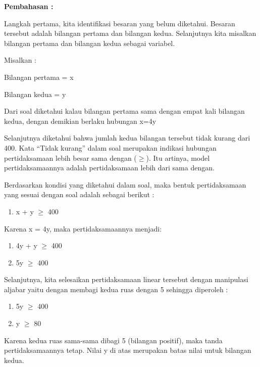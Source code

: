 \documentclass[11pt,fleqn]{book} %
\begin{document}
\noindent \textbf{Pembahasan :}

\noindent Langkah pertama, kita identifikasi besaran yang belum diketahui. Besaran tersebut adalah bilangan pertama dan bilangan kedua. Selanjutnya kita misalkan bilangan pertama dan bilangan kedua sebagai variabel.

\noindent Misalkan :

\noindent Bilangan pertama = x

\noindent Bilangan kedua = y 

\noindent Dari soal diketahui kalau bilangan pertama sama dengan empat kali bilangan kedua, dengan demikian berlaku hubungan x=4y 

\noindent 

\noindent Selanjutnya diketahui bahwa jumlah kedua bilangan tersebut tidak kurang dari 400. Kata ``Tidak kurang'' dalam soal merupakan indikasi hubungan pertidaksamaan lebih besar sama dengan ($\mathrm{\ge}$). Itu artinya, model pertidaksamaannya adalah pertidaksamaan lebih dari sama dengan.

\noindent 

\noindent Berdasarkan kondisi yang diketahui dalam soal, maka bentuk pertidaksamaan yang sesuai dengan soal adalah sebagai berikut :

\begin{enumerate}
\item  x + y $\mathrm{\ge}$ 400
\end{enumerate}

\noindent Karena x = 4y, maka pertidaksamaannya menjadi:

\begin{enumerate}
\item  4y + y $\mathrm{\ge}$ 400

\item  5y $\mathrm{\ge}$ 400
\end{enumerate}

\noindent 

\noindent Selanjutnya, kita selesaikan pertidaksamaan linear tersebut dengan manipulasi aljabar yaitu dengan membagi kedua ruas dengan 5 sehingga diperoleh :

\begin{enumerate}
\item  5y $\mathrm{\ge}$ 400

\item  y $\mathrm{\ge}$ 80
\end{enumerate}

\noindent Karena kedua ruas sama-sama dibagi 5 (bilangan positif), maka tanda pertidaksamaannya tetap. Nilai y di atas merupakan batas nilai untuk bilangan kedua.
\end{document}
